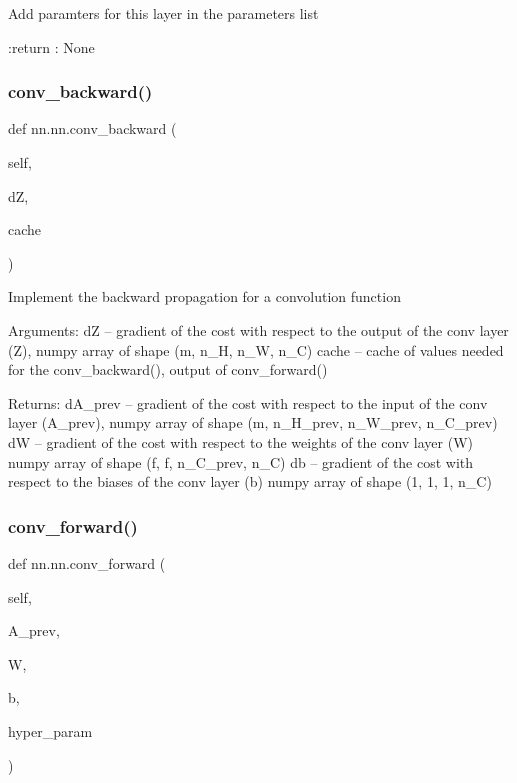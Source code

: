 \begin{DoxyVerb}Add paramters for this layer in the parameters list

:return : None
\end{DoxyVerb}
 \mbox{\label{classnn_1_1nn_a3b35ba09acdfe74500c3cb1359162997}} 
\subsubsection{\texorpdfstring{conv\+\_\+backward()}{conv\_backward()}}
{\footnotesize\ttfamily def nn.\+nn.\+conv\+\_\+backward (\begin{DoxyParamCaption}\item[{}]{self,  }\item[{}]{dZ,  }\item[{}]{cache }\end{DoxyParamCaption})}

\begin{DoxyVerb}Implement the backward propagation for a convolution function

Arguments:
dZ -- gradient of the cost with respect to the output of the conv layer (Z), numpy array of shape (m, n_H, n_W, n_C)
cache -- cache of values needed for the conv_backward(), output of conv_forward()

Returns:
dA_prev -- gradient of the cost with respect to the input of the conv layer (A_prev),
   numpy array of shape (m, n_H_prev, n_W_prev, n_C_prev)
dW -- gradient of the cost with respect to the weights of the conv layer (W)
      numpy array of shape (f, f, n_C_prev, n_C)
db -- gradient of the cost with respect to the biases of the conv layer (b)
      numpy array of shape (1, 1, 1, n_C)
\end{DoxyVerb}
 \mbox{\label{classnn_1_1nn_ae778f37f71cdca8e917112deae9f4735}} 
\subsubsection{\texorpdfstring{conv\+\_\+forward()}{conv\_forward()}}
{\footnotesize\ttfamily def nn.\+nn.\+conv\+\_\+forward (\begin{DoxyParamCaption}\item[{}]{self,  }\item[{}]{A\+\_\+prev,  }\item[{}]{W,  }\item[{}]{b,  }\item[{}]{hyper\+\_\+param }\end{DoxyParamCaption})}

